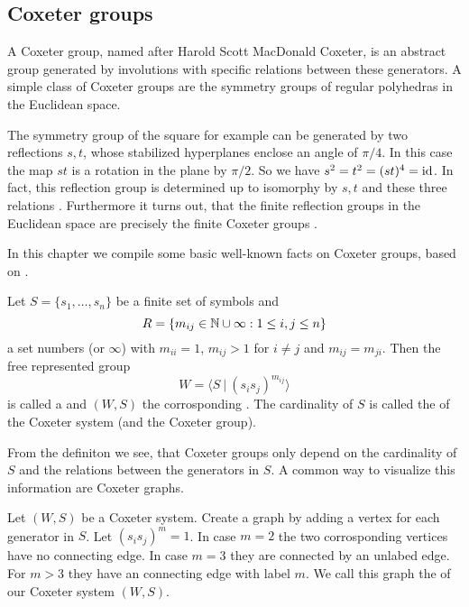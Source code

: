 \subsection{Coxeter groups}
\label{sec:coxeter-groups}

A Coxeter group, named after Harold Scott MacDonald Coxeter, is an abstract group generated by involutions with specific relations between these generators. A simple class of Coxeter groups are the symmetry groups of regular polyhedras in the Euclidean space.

The symmetry group of the square for example can be generated by two reflections $s,t$, whose stabilized hyperplanes enclose an angle of $\pi / 4$. In this case the map $st$ is a rotation in the plane by $\pi / 2$. So we have $s^2 = t^2 = (st)^4 = \operatorname{id}$. In fact, this reflection group is determined up to isomorphy by $s,t$ and these three relations \cite[Theorem 1.9]{humphreys:coxeter}. Furthermore it turns out, that the finite reflection groups in the Euclidean space are precisely the finite Coxeter groups \cite[Theorem 6.4]{humphreys:coxeter}.

In this chapter we compile some basic well-known facts on Coxeter groups, based on \cite{humphreys:coxeter}.

\begin{defi}
	Let $S = \{ s_1, \ldots, s_n \}$ be a finite set of symbols and
	$$R = \{ m_{ij} \in \mathbb{N} \cup \infty : 1 \leq i,j \leq n \}$$
	a set numbers (or $\infty$) with $m_{ii} = 1$, $m_{ij} > 1$ for $i \neq j$ and $m_{ij} = m_{ji}$. Then the free represented group
	$$W = \langle S \ | \ (s_i s_j)^{m_{ij}} \rangle$$
	is called a  and $(W,S)$ the corrosponding . The cardinality of $S$ is called the  of the Coxeter system (and the Coxeter group).
\end{defi}

From the definiton we see, that Coxeter groups only depend on the cardinality of $S$ and the relations between the generators in $S$. A common way to visualize this information are Coxeter graphs.

\begin{defi}
	Let $(W,S)$ be a Coxeter system. Create a graph by adding a vertex for each generator in $S$. Let $(s_i s_j)^m = 1$. In case $m = 2$ the two corrosponding vertices have no connecting edge. In case $m = 3$ they are connected by an unlabed edge. For $m > 3$ they have an connecting edge with label $m$. We call this graph the  of our Coxeter system $(W,S)$.
\end{defi}

